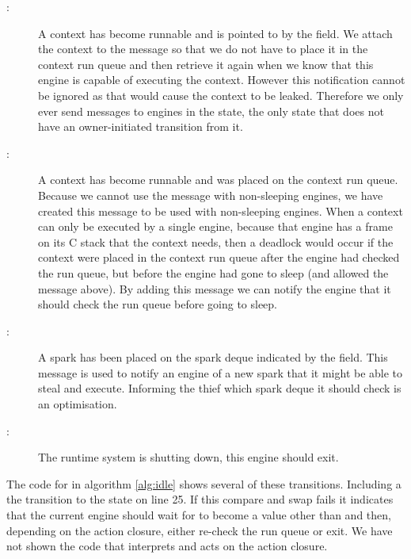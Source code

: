 \begin{description}

    \item[:]
    A context has become runnable and is pointed to by the
     field.
    We attach the context to the message so that we do not have to place it
    in the context run queue and then retrieve it again when we know that
    this engine is capable of executing the context.
    However this notification cannot be ignored as that would cause the
    context to be leaked.
    Therefore we only ever send  messages to engines in
    the  state,
    the only state that does not have an owner-initiated transition from 
    it.

    \item[:]
    A context has become runnable and was placed on the context run queue.
    Because we cannot use the  message with
    non-sleeping engines,
    we have created this message to be used with non-sleeping engines.
    When a context can only be executed by a single engine,
    because that engine has a frame on its C stack that the context needs,
    then a deadlock would occur if the context were placed in the context run
    queue after the engine had checked the run queue,
    but before the engine had gone to sleep (and allowed the message above).
    By adding this message we can notify the engine that it should check the
    run queue before going to sleep.

    \item[:]
    A spark has been placed on the spark deque indicated by the
     field.
    This message is used to notify an engine of a new spark that it might be
    able to steal and execute.
    Informing the thief which spark deque it should check is an
    optimisation.

    \item[:]
    The runtime system is shutting down, this engine should exit.

\end{description}

\noindent
{}
The code for \idle in algorithm \ref{alg:idle} shows several of these
transitions.
Including a the transition to the  state on line 25.
If this compare and swap fails it indicates that the current engine should 
wait for  to become a value other than  and then,
depending on the action closure,
either re-check the run queue or exit.
We have not shown the code that interprets and acts on the action closure.

